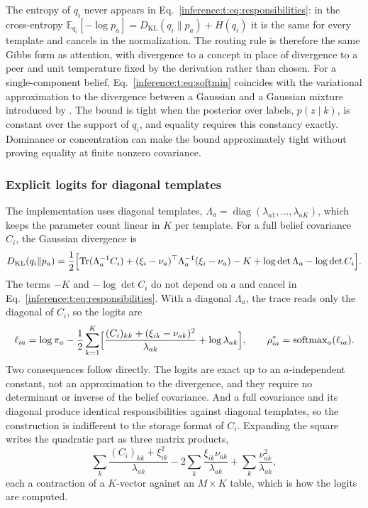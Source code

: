 \documentclass[11pt]{article}
\theoremstyle{definition}
\theoremstyle{remark}
\providecommand{\KL}{D_{\mathrm{KL}}}
\providecommand{\softmax}{\operatorname{softmax}}
\providecommand{\Tr}{\operatorname{Tr}}
\providecommand{\diag}{\operatorname{diag}}
\providecommand{\E}{\mathbb{E}}
\begin{document}
The entropy of $q_i$ never appears in Eq.~\eqref{inference:t:eq:responsibilities}: in the cross-entropy $\E_{q_i}[-\log p_a]=\KL(q_i\|p_a)+H(q_i)$ it is the same for every template and cancels in the normalization. The routing rule is therefore the same Gibbs form as attention, with divergence to a concept in place of divergence to a peer and unit temperature fixed by the derivation rather than chosen. For a single-component belief, Eq.~\eqref{inference:t:eq:softmin} coincides with the variational approximation to the divergence between a Gaussian and a Gaussian mixture introduced by \citep{inference:hershey2007}. The bound is tight when the posterior over labels, $p(z\mid k)$, is constant over the support of $q_i$, and equality requires this constancy exactly. Dominance or concentration can make the bound approximately tight without proving equality at finite nonzero covariance.

\subsubsection{Explicit logits for diagonal templates}

The implementation uses diagonal templates, $\Lambda_a=\diag(\lambda_{a1},\dots,\lambda_{aK})$, which keeps the parameter count linear in $K$ per template. For a full belief covariance $C_i$, the Gaussian divergence is
\begin{equation}
\KL(q_i\|p_a)=\frac12\Bigl[\Tr(\Lambda_a^{-1}C_i)+(\xi_i-\nu_a)^{\top}\Lambda_a^{-1}(\xi_i-\nu_a)-K+\log\det\Lambda_a-\log\det C_i\Bigr].
\label{inference:t:eq:gaussian_kl}
\end{equation}
The terms $-K$ and $-\log\det C_i$ do not depend on $a$ and cancel in Eq.~\eqref{inference:t:eq:responsibilities}. With a diagonal $\Lambda_a$, the trace reads only the diagonal of $C_i$, so the logits are
\begin{equation}
\ell_{ia}=\log\pi_a-\frac12\sum_{k=1}^K\Bigl[\frac{(C_i)_{kk}+(\xi_{ik}-\nu_{ak})^2}{\lambda_{ak}}+\log\lambda_{ak}\Bigr],
\qquad
\rho^{*}_{ia}=\softmax_a(\ell_{ia}).
\label{inference:t:eq:logits}
\end{equation}
Two consequences follow directly. The logits are exact up to an $a$-independent constant, not an approximation to the divergence, and they require no determinant or inverse of the belief covariance. And a full covariance and its diagonal produce identical responsibilities against diagonal templates, so the construction is indifferent to the storage format of $C_i$. Expanding the square writes the quadratic part as three matrix products,
\begin{equation}
\sum_k\frac{(C_i)_{kk}+\xi_{ik}^2}{\lambda_{ak}}
-2\sum_k\frac{\xi_{ik}\nu_{ak}}{\lambda_{ak}}
+\sum_k\frac{\nu_{ak}^2}{\lambda_{ak}},
\label{inference:t:eq:matmul_form}
\end{equation}
each a contraction of a $K$-vector against an $M\times K$ table, which is how the logits are computed.
\end{document}
